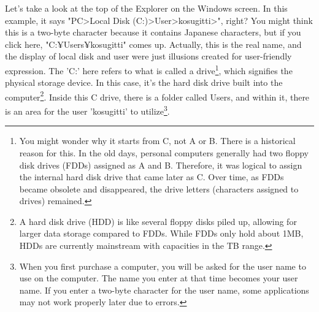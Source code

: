 \documentclass{ltjsbook}
\begin{document}
Let's take a look at the top of the Explorer on the Windows screen. In this example, it says "PC>Local Disk (C:)>User>kosugitti>", right? You might think this is a two-byte character because it contains Japanese characters, but if you click here, "C:¥Users¥kosugitti" comes up. Actually, this is the real name, and the display of local disk and user were just illusions created for user-friendly expression. The 'C:' here refers to what is called a drive\footnote{You might wonder why it starts from C, not A or B. There is a historical reason for this. In the old days, personal computers generally had two floppy disk drives (FDDs) assigned as A and B. Therefore, it was logical to assign the internal hard disk drive that came later as C. Over time, as FDDs became obsolete and disappeared, the drive letters (characters assigned to drives) remained.}, which signifies the physical storage device. In this case, it's the hard disk drive built into the computer\footnote{A hard disk drive (HDD) is like several floppy disks piled up, allowing for larger data storage compared to FDDs. While FDDs only hold about 1MB, HDDs are currently mainstream with capacities in the TB range.}. Inside this C drive, there is a folder called Users, and within it, there is an area for the user 'kosugitti' to utilize\footnote{When you first purchase a computer, you will be asked for the user name to use on the computer. The name you enter at that time becomes your user name. If you enter a two-byte character for the user name, some applications may not work properly later due to errors.}.
\end{document}
